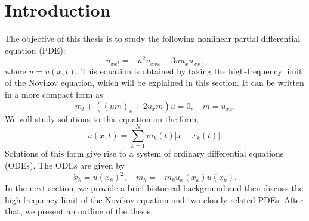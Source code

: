 \documentclass[english,master]{liumaiex}
\theoremstyle{plain}
\theoremstyle{definition}
\begin{document}
\placeenkeywords
\placeenurl

\newpage








\tableofcontents

\newpage



%
%

\section{Introduction}

The objective of this thesis is to study the following nonlinear partial differential equation (PDE):
\begin{equation}
	u_{xxt} = -u^2u_{xxx} - 3uu_xu_{xx},
\end{equation}
where $u = u(x, t)$. This equation is obtained by taking the high-frequency limit of the Novikov equation, which will be explained in this section. It can be written in a more compact form as
\begin{equation}
	m_t + ((um)_x + 2u_xm) u = 0,\quad m = u_{xx}.
\end{equation}
We will study solutions to this equation on the form,
\begin{equation}
	u(x, t) = \sum_{k = 1}^{N} m_k(t) |x - x_k(t)|.
\end{equation}
Solutions of this form give rise to a system of ordinary differential equations (ODEs). The ODEs are given by
\begin{equation}
	\dot{x}_k = u(x_k)^2, \quad
	\dot{m}_k = -m_ku_x(x_k)u(x_k).
\end{equation}
In the next section, we provide a brief historical background and then discuss the high-frequency limit of the Novikov equation and two closely related PDEs. After that, we present an outline of the thesis.
\end{document}
